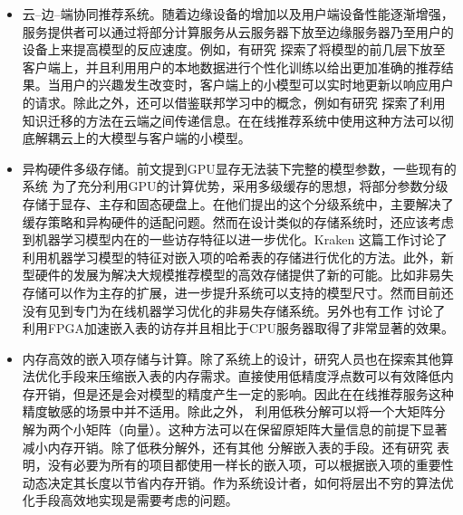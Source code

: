 \documentclass[letterpaper,10pt,english]{sphinxmanual}
\begin{document}
\begin{itemize}
\item {} 
\sphinxAtStartPar
云–边–端协同推荐系统。随着边缘设备的增加以及用户端设备性能逐渐增强，服务提供者可以通过将部分计算服务从云服务器下放至边缘服务器乃至用户的设备上来提高模型的反应速度。例如，有研究
探索了将模型的前几层下放至客户端上，并且利用用户的本地数据进行个性化训练以给出更加准确的推荐结果。当用户的兴趣发生改变时，客户端上的小模型可以实时地更新以响应用户的请求。除此之外，还可以借鉴联邦学习中的概念，例如有研究
探索了利用知识迁移的方法在云\sphinxhyphen{}端之间传递信息。在在线推荐系统中使用这种方法可以彻底解耦云上的大模型与客户端的小模型。

\item {} 
\sphinxAtStartPar
异构硬件多级存储。前文提到GPU显存无法装下完整的模型参数，一些现有的系统
为了充分利用GPU的计算优势，采用多级缓存的思想，将部分参数分级存储于显存、主存和固态硬盘上。在他们提出的这个分级系统中，主要解决了缓存策略和异构硬件的适配问题。然而在设计类似的存储系统时，还应该考虑到机器学习模型内在的一些访存特征以进一步优化。Kraken
这篇工作讨论了利用机器学习模型的特征对嵌入项的哈希表的存储进行优化的方法。此外，新型硬件的发展为解决大规模推荐模型的高效存储提供了新的可能。比如非易失存储可以作为主存的扩展，进一步提升系统可以支持的模型尺寸。然而目前还没有见到专门为在线机器学习优化的非易失存储系统。另外也有工作
讨论了利用FPGA加速嵌入表的访存并且相比于CPU服务器取得了非常显著的效果。

\item {} 
\sphinxAtStartPar
内存高效的嵌入项存储与计算。除了系统上的设计，研究人员也在探索其他算法优化手段来压缩嵌入表的内存需求。直接使用低精度浮点数可以有效降低内存开销，但是还是会对模型的精度产生一定的影响。因此在在线推荐服务这种精度敏感的场景中并不适用。除此之外，
利用低秩分解可以将一个大矩阵分解为两个小矩阵（向量）。这种方法可以在保留原矩阵大量信息的前提下显著减小内存开销。除了低秩分解外，还有其他
分解嵌入表的手段。还有研究
表明，没有必要为所有的项目都使用一样长的嵌入项，可以根据嵌入项的重要性动态决定其长度以节省内存开销。作为系统设计者，如何将层出不穷的算法优化手段高效地实现是需要考虑的问题。

\end{itemize}
\end{document}
